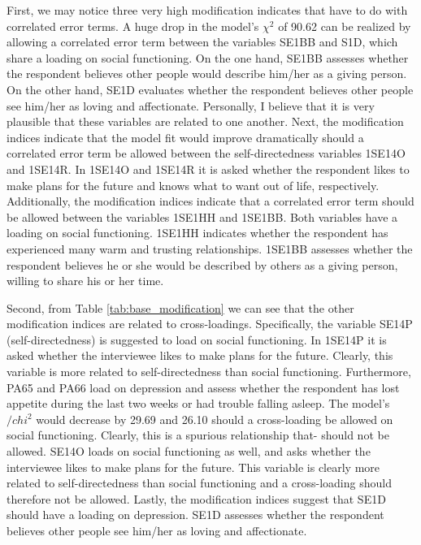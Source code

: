 \documentclass[11pt]{article}
\begin{document}
First, we may notice three very high modification indicates that have to do with
correlated error terms.
A huge drop in the model's $\chi^2$ of 90.62 can be realized by allowing a
correlated error term between the variables SE1BB and S1D, which share a loading
on social functioning. On the one hand, SE1BB assesses whether the respondent
believes other people would describe him/her as a giving person. On the other
hand, SE1D evaluates whether the respondent believes other people see him/her as
loving and affectionate. Personally, I believe that it is very plausible that
these variables are related to one another.
Next, the modification indices indicate that the model fit would improve
dramatically should a correlated error term be allowed between the
self-directedness variables 1SE14O and 1SE14R. In 1SE14O and 1SE14R it is asked
whether the respondent likes to make plans for the future and knows what to want
out of life, respectively.
Additionally, the modification indices indicate that a correlated error term
should be allowed between the variables 1SE1HH and 1SE1BB. Both variables have a
loading on social functioning. 1SE1HH indicates whether the respondent has
experienced many warm and trusting relationships. 1SE1BB assesses whether the
respondent believes he or she would be described by others as a giving person,
willing to share his or her time.

Second, from Table \ref{tab:base_modification} we can see that the other
modification indices are related to cross-loadings.
Specifically, the variable SE14P (self-directedness) is suggested to
load on social functioning. In 1SE14P it is asked whether the interviewee likes
to make plans for the future. Clearly, this variable is more related to
self-directedness than social functioning.
Furthermore, PA65 and PA66 load on depression and assess whether the respondent
has lost appetite during the last two weeks or had trouble falling asleep. The
model's $/chi^2$ would decrease by 29.69 and 26.10 should a cross-loading be
allowed on social functioning. Clearly, this is a spurious relationship that-
should not be allowed.
SE14O loads on social functioning as well, and asks whether the interviewee
likes to make plans for the future. This variable is clearly more related to
self-directedness than social functioning and a cross-loading should therefore
not be allowed.
Lastly, the modification indices suggest that SE1D should have a loading on
depression. SE1D assesses whether the respondent believes other people see
him/her as loving and affectionate.
\end{document}
